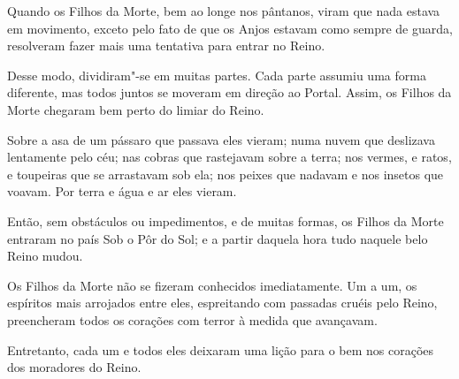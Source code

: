 Quando os Filhos da Morte, bem ao longe nos pântanos, viram que nada
estava em movimento, exceto pelo fato de que os Anjos estavam como
sempre de guarda, resolveram fazer mais uma tentativa para entrar no
Reino.

Desse modo, dividiram"-se em muitas partes. Cada parte assumiu uma forma
diferente, mas todos juntos se moveram em direção ao Portal. Assim, os
Filhos da Morte chegaram bem perto do limiar do Reino.

Sobre a asa de um pássaro que passava eles vieram; numa nuvem que
deslizava lentamente pelo céu; nas cobras que rastejavam sobre a terra;
nos vermes, e ratos, e toupeiras que se arrastavam sob ela; nos peixes
que nadavam e nos insetos que voavam. Por terra e água e ar eles vieram.

Então, sem obstáculos ou impedimentos, e de muitas formas, os Filhos da
Morte entraram no país Sob o Pôr do Sol; e a partir daquela hora tudo
naquele belo Reino mudou.

Os Filhos da Morte não se fizeram conhecidos imediatamente. Um a um, os
espíritos mais arrojados entre eles, espreitando com passadas cruéis
pelo Reino, preencheram todos os corações com terror à medida que
avançavam.

Entretanto, cada um e todos eles deixaram uma lição para o bem nos
corações dos moradores do Reino.
